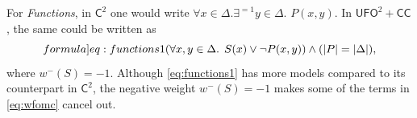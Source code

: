 \documentclass[a4paper,UKenglish,cleveref, autoref, thm-restate]{lipics-v2021}
\newcommand{\Ctwo}{$\mathsf{C}^{2}$}
\newcommand{\UFO}{$\mathsf{UFO}^{2} + \mathsf{CC}$}
\newcommand{\functions}{\emph{Functions}}
\begin{document}
For \functions{}, in \Ctwo{} one would write $\forall x \in \Delta\text{.
}\exists^{=1} y \in \Delta\text{. }P(x, y)$. In \UFO{}, the same could be
written as
\begin{equation}\label[formula]{eq:functions1}
  (\forall x, y \in \Delta\text{. }S(x) \lor \neg P(x, y)) \land (|P| = |\Delta|),
\end{equation}
where $w^{-}(S) = -1$. Although \cref{eq:functions1} has more models compared to
its counterpart in \Ctwo{}, the negative weight $w^{-}(S) = -1$ makes some of
the terms in \cref{eq:wfomc} cancel out.
\end{document}
